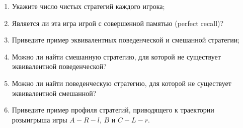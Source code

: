 \begin{problem}

\begin{enumerate}
\item Укажите число чистых стратегий каждого игрока;\par
\item Является ли эта игра игрой с совершенной памятью (perfect recall)?\par
\item  Приведите пример эквивалентных поведенческой и смешанной стратегии; \par
\item Можно ли найти смешанную стратегию, для которой не существует эквивалентной поведенческой? \par
\item Можно ли найти поведенческую стратегию, для которой не существует эквивалентной смешанной? \par
\item Приведите пример профиля стратегий, приводящего к  траектории розыигрыша игры  $A-R-l$,  $B$  и  $C-L-r$.
\end{enumerate}


\begin{sol}

\end{sol}
\end{problem}




